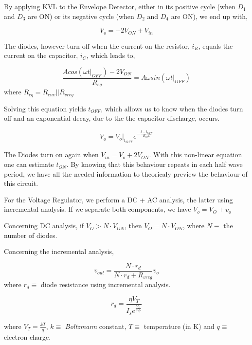 By applying KVL to the Envelope Detector, either in its positive cycle (when $D_1$ and $D_3$ are ON) or its negative cycle (when $D_2$ and $D_4$ are ON), we end up with, 

\begin{equation}
    V_o=-2V_{ON}+V_{in}
\end{equation}

The diodes, however turn off when the current on the resistor, $i_R$, equals the current on the capacitor, $i_C$, which leads to,

\begin{equation}
    \frac{Acos(\omega t|_{OFF})-2V_{ON}}{R_{eq}}=A\omega sin(\omega t|_{OFF})
\end{equation}
where $R_{eq}=R_{env}||R_{vreg}$

Solving this equation yields $t_{OFF}$, which allows us to know when the diodes turn off and an exponential decay, due to the the capacitor discharge, occurs. 

\begin{equation}
    V_o=V_o|_{t_{OFF}}e^{-\frac{t-t_{OFF}}{R_{eq}C}}
\end{equation}

The Diodes turn on again when $V_{in}=V_o+2V_{ON}$. With this non-linear equation one can estimate $t_{ON}$. By knowing that this behaviour repeats in each half wave period, we have all the needed information to theoricaly preview the behaviour of this circuit.

For the Voltage Regulator, we perform a DC + AC analysis, the latter using incremental analysis. If we separate both components, we have $V_o=V_O+v_o$

Concerning DC analysis, if $V_O>N \cdot V_{ON}$, then $V_O=N \cdot V_{ON}$, where $N\equiv$ the number of diodes.

Concerning the incremental analysis, 

\begin{equation}
    v_{out}=\frac{N\cdot r_d}{N\cdot r_d + R_{vreg}}v_o
\end{equation}
where $r_d\equiv$ diode resistance using incremental analysis.

\begin{equation}
    r_d=\frac{\eta V_T}{I_s e^{\frac{V_D}{\eta V_T}}}
\end{equation}

where $V_T=\frac{kT}{q}$, $k\equiv$ \textit{Boltzmann} constant, $T\equiv$ temperature (in K) and $q\equiv$ electron charge.

